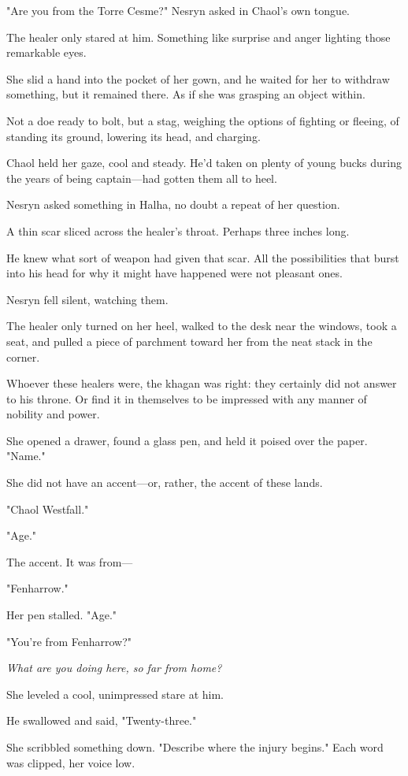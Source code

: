 "Are you from the Torre Cesme?"
Nesryn asked in Chaol's own tongue.

The healer only stared at him.
Something like surprise and anger lighting those remarkable eyes.

She slid a hand into the pocket of her gown, and he waited for her to withdraw something, but it remained there.
As if she was grasping an object within.

Not a doe ready to bolt, but a stag, weighing the options of fighting or fleeing, of standing its ground, lowering its head, and charging.

Chaol held her gaze, cool and steady.
He'd taken on plenty of young bucks during the years of being captain---had gotten them all to heel.

Nesryn asked something in Halha, no doubt a repeat of her question.

A thin scar sliced across the healer's throat.
Perhaps three inches long.

He knew what sort of weapon had given that scar.
All the possibilities that burst into his head for why it might have happened were not pleasant ones.

Nesryn fell silent, watching them.

The healer only turned on her heel, walked to the desk near the windows, took a seat, and pulled a piece of parchment toward her from the neat stack in the corner.

Whoever these healers were, the khagan was right: they certainly did not answer to his throne.
Or find it in themselves to be impressed with any manner of nobility and power.

She opened a drawer, found a glass pen, and held it poised over the paper.
"Name."

She did not have an accent---or, rather, the accent of these lands.

"Chaol Westfall."

"Age."

The accent.
It was from---

"Fenharrow."

Her pen stalled.
"Age."

"You're from Fenharrow?"

\emph{What are you doing here, so far from home?}

She leveled a cool, unimpressed stare at him.

He swallowed and said, "Twenty-three."

She scribbled something down.
"Describe where the injury begins."
Each word was clipped, her voice low.

